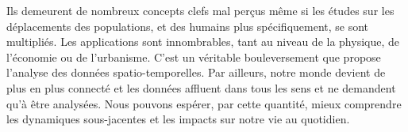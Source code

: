 Ils demeurent de nombreux concepts clefs mal perçus même si les études sur les déplacements des populations, et des humains plus spécifiquement, se sont multipliés. Les applications sont innombrables, tant au niveau de la physique, de l'économie ou de l'urbanisme. C'est un véritable bouleversement que propose l'analyse des données spatio-temporelles. Par ailleurs, notre monde devient de plus en plus connecté et les données affluent dans tous les sens et ne demandent qu'à être analysées. Nous pouvons espérer, par cette quantité, mieux comprendre les dynamiques sous-jacentes et les impacts sur notre vie au quotidien.
